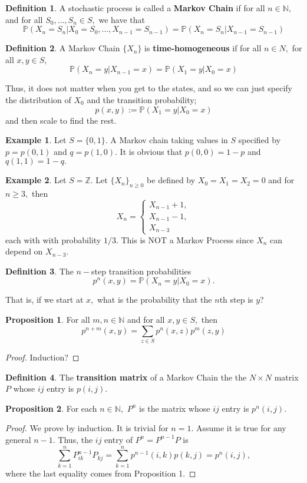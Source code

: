 \documentclass[10pt, oneside]{article}
\newcommand{\bbZ}{\mathbb{Z}}
\newcommand{\bbP}{\mathbb{P}}
\newcommand{\bbN}{\mathbb{N}}
\theoremstyle{definition}
\newtheorem{exmp}{Example}[section]
\newtheorem{defn}{Definition}
\newtheorem{prop}{Proposition}
\begin{document}
\begin{defn}
    A stochastic process is called a \textbf{Markov Chain} if for all $n \in \bbN,$ and for all $S_0, \dots, S_n \in S,$ we have that 
    \[\bbP(X_n = S_n |  X_0= S_0, \dots, X_{n-1}= S_{n-1}) = \bbP(X_n = S_n | X_{n-1} =S_{n-1})\]
\end{defn}
\begin{defn}
    A Markov Chain $\{X_n\}$ is \textbf{time-homogeneous} if for all $n\in N,$ for all $x,y \in S,$ 
    \[\bbP(X_n = y | X_{n-1} = x) = \bbP(X_1 = y | X_0 = x)\]
\end{defn}
Thus, it does not matter when you get to the states, and so we can just specify the distribution of $X_0$ and the transition probability;
\[p(x,y) := \bbP(X_1 = y | X_0 = x)\]
and then scale to find the rest.
\begin{exmp}
    Let $S = \{0,1\}.$ A Markov chain taking values in $S$ specified by $p = p(0,1)$ and $q = p(1,0).$ It is obvious that $p(0,0) = 1-p$ and $q(1,1) = 1-q.$
\end{exmp}
\begin{exmp}
    Let $S = \bbZ.$ Let $\{X_n\}_{n\geq 0}$ be defined by $X_0 = X_1 = X_2 =0$ and for $n\geq 3,$ then 
    \[X_n = \begin{cases}
        X_{n-1} + 1,\\
        X_{n-1} - 1,\\
        X_{n-3}
    \end{cases}\]
    each with with probability $1/3.$ This is NOT a Markov Process since $X_n$ can depend on $X_{n-3}.$
\end{exmp}

\begin{defn}
    The $n-$step transition probabilities 
    \[p^n(x,y) = \bbP(X_n = y | X_0 = x).\]
\end{defn}
That is, if we start at $x,$ what is the probability that the $n$th step is $y$?
\begin{prop}
    For all $m,n \in \bbN$ and for all $x,y \in S,$ then 
    \[p^{n + m}(x,y) = \sum_{z\in S}p^n(x,z)p^m(z,y)\]
\end{prop}
\begin{proof}
    Induction?
\end{proof}
\begin{defn}
    The \textbf{transition matrix} of a Markov Chain the the $N \times N$ matrix $P$ whose $ij$ entry is $p(i,j).$
\end{defn}
\begin{prop}
    For each $n \in \bbN,$ $P^n$ is the matrix whose $ij$ entry is $p^n(i,j).$
\end{prop}
\begin{proof}
    We prove by induction. It is trivial for $n = 1.$ Assume it is true for any general $n-1.$ Thus, the $ij$ entry of $P^n = P^{n-1}P$ is \[\sum_{k=1}^n P^{n-1}_{ik}P_{kj} = \sum_{k=1}^n p^{n-1}(i,k)p(k,j) = p^n(i,j),\] where the last equality comes from Proposition 1.
\end{proof}
\end{document}
